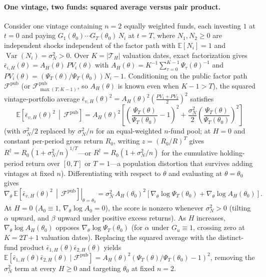 \documentclass[12pt]{article}
\begin{document}
\paragraph{One vintage, two funds: squared average versus pair product.}
Consider one vintage containing $n = 2$ equally weighted funds, each investing $1$ at $t=0$ and paying $G_1(\theta_0)\cdots G_T(\theta_0)\,N_i$ at $t=T$, where $N_1, N_2 \ge 0$ are independent shocks independent of the factor path with $\mathbb{E}[N_i]=1$ and $\operatorname{Var}(N_i)=\sigma_N^2 > 0$.
Over $K = |\mathcal{T}_H|$ valuation dates, exact factorization gives $\bar\epsilon_{i,H}(\theta) = A_H(\theta)\,PV_i(\theta)$ with $A_H(\theta) = K^{-1}\sum_{\tau=0}^{K-1} \Psi_\tau(\theta)^{-1}$ and $PV_i(\theta) = (\Psi_T(\theta)/\Psi_T(\theta_0))N_i - 1$.
Conditioning on the public factor path $\mathcal{F}^{\mathrm{pub}}$ (or $\mathcal{F}_{\max(T,K-1)}^{\mathrm{pub}}$, so $A_H(\theta)$ is known even when $K-1 > T$), the squared vintage-portfolio average $\bar\epsilon_{v,H}(\theta)^2 = A_H(\theta)^2(\frac{PV_1 + PV_2}{2})^2$ satisfies
\[
\mathbb{E}\!\left[\bar\epsilon_{v,H}(\theta)^2 \,\middle|\, \mathcal{F}^{\mathrm{pub}}\right]
= A_H(\theta)^2\!\left[\left(\frac{\Psi_T(\theta)}{\Psi_T(\theta_0)} - 1\right)^2 + \frac{\sigma_N^2}{2}\left(\frac{\Psi_T(\theta)}{\Psi_T(\theta_0)}\right)^2\right]
\]
(with $\sigma_N^2/2$ replaced by $\sigma_N^2/n$ for an equal-weighted $n$-fund pool; at $H=0$ and constant per-period gross return $R_0$, writing $z = (R_0/R)^T$ gives $R^\dagger = R_0(1 + \sigma_N^2/n)^{1/T}$---or $R^\dagger = R_0(1 + \sigma_N^2/n)$ for the cumulative holding-period return over $[0,T]$ or $T = 1$---a population distortion that survives adding vintages at fixed $n$).
Differentiating with respect to $\theta$ and evaluating at $\theta = \theta_0$ gives
\begin{equation}
\label{eq:one_deal_gradient}
\left.\nabla_\theta\,\mathbb{E}\!\left[\bar\epsilon_{v,H}(\theta)^2 \,\middle|\, \mathcal{F}^{\mathrm{pub}}\right]\right|_{\theta=\theta_0}
= \sigma_N^2\,A_H(\theta_0)^2\!\left[\nabla_\theta \log \Psi_T(\theta_0) + \nabla_\theta \log A_H(\theta_0)\right].
\end{equation}
At $H=0$ ($A_0 \equiv 1$, $\nabla_\theta \log A_0 = 0$), the score is nonzero whenever $\sigma_N^2 > 0$ (tilting $\alpha$ upward, and $\beta$ upward under positive excess returns).
As $H$ increases, $\nabla_\theta \log A_H(\theta_0)$ opposes $\nabla_\theta \log \Psi_T(\theta_0)$ (for $\alpha$ under $G_u \equiv 1$, crossing zero at $K = 2T + 1$ valuation dates).
Replacing the squared average with the distinct-fund product $\bar\epsilon_{1,H}(\theta)\bar\epsilon_{2,H}(\theta)$ yields $\mathbb{E}[\bar\epsilon_{1,H}(\theta)\bar\epsilon_{2,H}(\theta)\mid\mathcal{F}^{\mathrm{pub}}] = A_H(\theta)^2(\Psi_T(\theta)/\Psi_T(\theta_0) - 1)^2$, removing the $\sigma_N^2$ term at every $H \ge 0$ and targeting $\theta_0$ at fixed $n = 2$.
\end{document}
